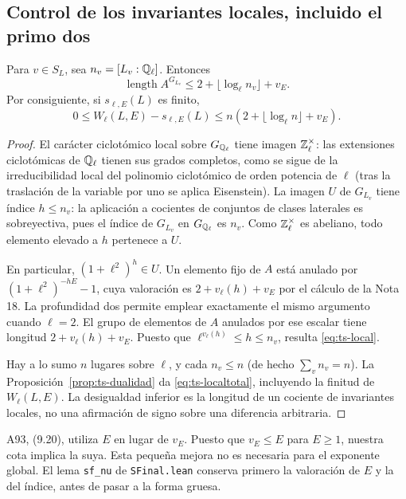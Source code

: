 \subsection{Control de los invariantes locales, incluido el primo dos}

\begin{proposicion}
\label{prop:ts-local}
Para $v\in S_L$, sea $n_v=[L_v:\mathbb{Q}_\ell]$. Entonces
\begin{equation}
 \operatorname{length} A^{G_{L_v}}\le 2+\lfloor\log_\ell n_v\rfloor+v_E.
 \label{eq:ts-local}
\end{equation}
Por consiguiente, si $s_{\ell,E}(L)$ es finito,
\begin{equation}
 0\le W_\ell(L,E)-s_{\ell,E}(L)
 \le n(2+\lfloor\log_\ell n\rfloor+v_E).
 \label{eq:ts-localtotal}
\end{equation}
\end{proposicion}
\begin{proof}
El carácter ciclotómico local sobre $G_{\mathbb{Q}_\ell}$ tiene imagen $\mathbb{Z}_\ell^\times$: las extensiones ciclotómicas de $\mathbb{Q}_\ell$ tienen sus grados completos, como se sigue de la irreducibilidad local del polinomio ciclotómico de orden potencia de $\ell$ (tras la traslación de la variable por uno se aplica Eisenstein). La imagen $U$ de $G_{L_v}$ tiene índice $h\le n_v$: la aplicación a cocientes de conjuntos de clases laterales es sobreyectiva, pues el índice de $G_{L_v}$ en $G_{\mathbb{Q}_\ell}$ es $n_v$. Como $\mathbb{Z}_\ell^\times$ es abeliano, todo elemento elevado a $h$ pertenece a $U$.

En particular, $(1+\ell^2)^h\in U$. Un elemento fijo de $A$ está anulado por
$ (1+\ell^2)^{-hE}-1$, cuya valoración es $2+v_\ell(h)+v_E$ por el cálculo de la Nota 18. La profundidad dos permite emplear exactamente el mismo argumento cuando $\ell=2$. El grupo de elementos de $A$ anulados por ese escalar tiene longitud $2+v_\ell(h)+v_E$. Puesto que $\ell^{v_\ell(h)}\le h\le n_v$, resulta \eqref{eq:ts-local}.

Hay a lo sumo $n$ lugares sobre $\ell$, y cada $n_v\le n$ (de hecho $\sum_v n_v=n$). La Proposición~\ref{prop:ts-dualidad} da \eqref{eq:ts-localtotal}, incluyendo la finitud de $W_\ell(L,E)$. La desigualdad inferior es la longitud de un cociente de invariantes locales, no una afirmación de signo sobre una diferencia arbitraria.
\end{proof}

A93, (9.20), utiliza $E$ en lugar de $v_E$. Puesto que $v_E\le E$ para $E\ge1$, nuestra cota implica la suya. Esta pequeña mejora no es necesaria para el exponente global. El lema \texttt{sf\_nu} de \texttt{SFinal.lean} conserva primero la valoración de $E$ y la del índice, antes de pasar a la forma gruesa.

